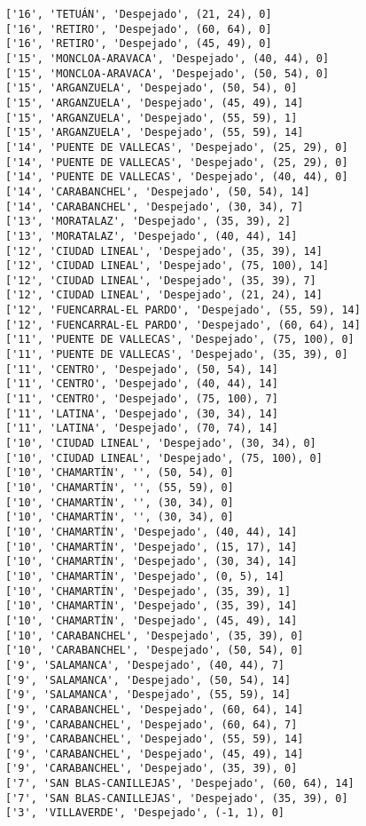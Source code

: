 \documentclass[11pt]{article}
\begin{document}
\begin{Verbatim}[commandchars=\\\{\}]
['16', 'TETUÁN', 'Despejado', (21, 24), 0]
['16', 'RETIRO', 'Despejado', (60, 64), 0]
['16', 'RETIRO', 'Despejado', (45, 49), 0]
['15', 'MONCLOA-ARAVACA', 'Despejado', (40, 44), 0]
['15', 'MONCLOA-ARAVACA', 'Despejado', (50, 54), 0]
['15', 'ARGANZUELA', 'Despejado', (50, 54), 0]
['15', 'ARGANZUELA', 'Despejado', (45, 49), 14]
['15', 'ARGANZUELA', 'Despejado', (55, 59), 1]
['15', 'ARGANZUELA', 'Despejado', (55, 59), 14]
['14', 'PUENTE DE VALLECAS', 'Despejado', (25, 29), 0]
['14', 'PUENTE DE VALLECAS', 'Despejado', (25, 29), 0]
['14', 'PUENTE DE VALLECAS', 'Despejado', (40, 44), 0]
['14', 'CARABANCHEL', 'Despejado', (50, 54), 14]
['14', 'CARABANCHEL', 'Despejado', (30, 34), 7]
['13', 'MORATALAZ', 'Despejado', (35, 39), 2]
['13', 'MORATALAZ', 'Despejado', (40, 44), 14]
['12', 'CIUDAD LINEAL', 'Despejado', (35, 39), 14]
['12', 'CIUDAD LINEAL', 'Despejado', (75, 100), 14]
['12', 'CIUDAD LINEAL', 'Despejado', (35, 39), 7]
['12', 'CIUDAD LINEAL', 'Despejado', (21, 24), 14]
['12', 'FUENCARRAL-EL PARDO', 'Despejado', (55, 59), 14]
['12', 'FUENCARRAL-EL PARDO', 'Despejado', (60, 64), 14]
['11', 'PUENTE DE VALLECAS', 'Despejado', (75, 100), 0]
['11', 'PUENTE DE VALLECAS', 'Despejado', (35, 39), 0]
['11', 'CENTRO', 'Despejado', (50, 54), 14]
['11', 'CENTRO', 'Despejado', (40, 44), 14]
['11', 'CENTRO', 'Despejado', (75, 100), 7]
['11', 'LATINA', 'Despejado', (30, 34), 14]
['11', 'LATINA', 'Despejado', (70, 74), 14]
['10', 'CIUDAD LINEAL', 'Despejado', (30, 34), 0]
['10', 'CIUDAD LINEAL', 'Despejado', (75, 100), 0]
['10', 'CHAMARTÍN', '', (50, 54), 0]
['10', 'CHAMARTÍN', '', (55, 59), 0]
['10', 'CHAMARTÍN', '', (30, 34), 0]
['10', 'CHAMARTÍN', '', (30, 34), 0]
['10', 'CHAMARTÍN', 'Despejado', (40, 44), 14]
['10', 'CHAMARTÍN', 'Despejado', (15, 17), 14]
['10', 'CHAMARTÍN', 'Despejado', (30, 34), 14]
['10', 'CHAMARTÍN', 'Despejado', (0, 5), 14]
['10', 'CHAMARTÍN', 'Despejado', (35, 39), 1]
['10', 'CHAMARTÍN', 'Despejado', (35, 39), 14]
['10', 'CHAMARTÍN', 'Despejado', (45, 49), 14]
['10', 'CARABANCHEL', 'Despejado', (35, 39), 0]
['10', 'CARABANCHEL', 'Despejado', (50, 54), 0]
['9', 'SALAMANCA', 'Despejado', (40, 44), 7]
['9', 'SALAMANCA', 'Despejado', (50, 54), 14]
['9', 'SALAMANCA', 'Despejado', (55, 59), 14]
['9', 'CARABANCHEL', 'Despejado', (60, 64), 14]
['9', 'CARABANCHEL', 'Despejado', (60, 64), 7]
['9', 'CARABANCHEL', 'Despejado', (55, 59), 14]
['9', 'CARABANCHEL', 'Despejado', (45, 49), 14]
['9', 'CARABANCHEL', 'Despejado', (35, 39), 0]
['7', 'SAN BLAS-CANILLEJAS', 'Despejado', (60, 64), 14]
['7', 'SAN BLAS-CANILLEJAS', 'Despejado', (35, 39), 0]
['3', 'VILLAVERDE', 'Despejado', (-1, 1), 0]

\end{Verbatim}
\end{document}
